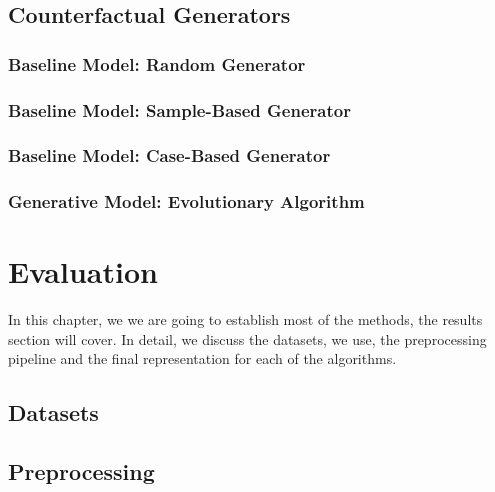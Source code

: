 \documentclass[12pt,a4paper]{report}
\begin{document}
\section{Counterfactual Generators}
\label{sec:model_generation}
\subsection{Baseline Model: Random Generator}


\subsection{Baseline Model: Sample-Based Generator}


\subsection{Baseline Model: Case-Based Generator}


\subsection{Generative Model: Evolutionary Algorithm}
\label{sec:model_evolutionary}


\chapter{Evaluation}
\label{sec:datasets}
In this chapter, we we are going to establish most of the methods, the results section will cover. In detail, we discuss the datasets, we use, the preprocessing pipeline and the final representation for each of the algorithms.


\section{Datasets}
\label{sec:dataset_description}

% 
% 


\section{Preprocessing}
\label{sec:preprocessing}

\end{document}
